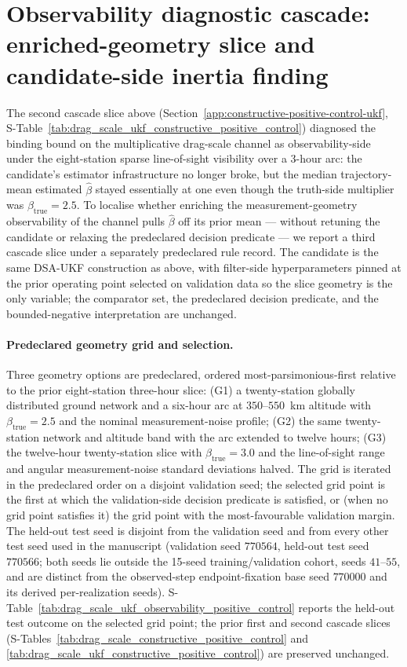 \documentclass{article}
\begin{document}
\clearpage
\section{Observability diagnostic cascade: enriched-geometry slice and candidate-side inertia finding}
\label{app:observability-positive-control-ukf}

The second cascade slice above (Section~\ref{app:constructive-positive-control-ukf}, S-Table~\ref{tab:drag_scale_ukf_constructive_positive_control}) diagnosed the binding bound on the multiplicative drag-scale channel as observability-side under the eight-station sparse line-of-sight visibility over a 3-hour arc: the candidate's estimator infrastructure no longer broke, but the median trajectory-mean estimated $\hat{\beta}$ stayed essentially at one even though the truth-side multiplier was $\beta_{\mathrm{true}}=2.5$. To localise whether enriching the measurement-geometry observability of the channel pulls $\hat{\beta}$ off its prior mean --- without retuning the candidate or relaxing the predeclared decision predicate --- we report a third cascade slice under a separately predeclared rule record. The candidate is the same DSA-UKF construction as above, with filter-side hyperparameters pinned at the prior operating point selected on validation data so the slice geometry is the only variable; the comparator set, the predeclared decision predicate, and the bounded-negative interpretation are unchanged.

\paragraph{Predeclared geometry grid and selection.}
Three geometry options are predeclared, ordered most-parsimonious-first relative to the prior eight-station three-hour slice: (G1) a twenty-station globally distributed ground network and a six-hour arc at $350$--$550$~km altitude with $\beta_{\mathrm{true}}=2.5$ and the nominal measurement-noise profile; (G2) the same twenty-station network and altitude band with the arc extended to twelve hours; (G3) the twelve-hour twenty-station slice with $\beta_{\mathrm{true}}=3.0$ and the line-of-sight range and angular measurement-noise standard deviations halved. The grid is iterated in the predeclared order on a disjoint validation seed; the selected grid point is the first at which the validation-side decision predicate is satisfied, or (when no grid point satisfies it) the grid point with the most-favourable validation margin. The held-out test seed is disjoint from the validation seed and from every other test seed used in the manuscript (validation seed $770564$, held-out test seed $770566$; both seeds lie outside the 15-seed training/validation cohort, seeds $41$--$55$, and are distinct from the observed-step endpoint-fixation base seed $770000$ and its derived per-realization seeds). S-Table~\ref{tab:drag_scale_ukf_observability_positive_control} reports the held-out test outcome on the selected grid point; the prior first and second cascade slices (S-Tables~\ref{tab:drag_scale_constructive_positive_control} and \ref{tab:drag_scale_ukf_constructive_positive_control}) are preserved unchanged.
\end{document}
